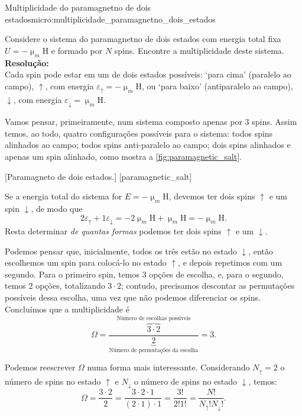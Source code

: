     \begin{example}{Multiplicidade do paramagnetno de dois estados}{micro:multiplicidade_paramagnetno_dois_estados}
        
        Considere o sistema do paramagnetno de dois estados com energia total fixa $U=-\upmu_m\mathrm{H}$ e formado por $N$ spins. Encontre a multiplicidade deste sistema.
        \tcblower
        \noindent\textbf{Resolução:}\\
        \indent Cada spin pode estar em um de dois estados possíveis: `para cima' (paralelo ao campo), $\uparrow$, com energia $\varepsilon_{\uparrow}=-\upmu_m\mathrm{H}$, ou `para baixo' (antiparalelo ao campo), $\downarrow$, com energia $\varepsilon_{\downarrow}=\upmu_m\mathrm{H}$.

        Vamos pensar, primeiramente, num sistema composto apenas por 3 spins. Assim temos, ao todo, quatro configurações possíveis para o sistema: todos spins alinhados ao campo; todos spins anti-paralelo ao campo; dois spins alinhados e apenas um spin alinhado, como mostra a \cref{fig:paramagnetic_salt}.

        \tikzFig%
            {\ParamagneticSalt}%
            [Paramagneto de dois estados.]%
            [paramagnetic_salt]%

        Se a energia total do sistema for $E=-\upmu_m\mathrm{H}$, devemos ter dois spins $\uparrow$ e um spin $\downarrow$, de modo que \[2\varepsilon_{\uparrow}+1\varepsilon_{\downarrow}=-2\upmu_m\mathrm{H}+\upmu_m\mathrm{H}=-\upmu_m\mathrm{H}.\] Resta determinar \textit{de quantas formas} podemos ter dois spins $\uparrow$ e um $\downarrow$. 
        
        Podemos pensar que, inicialmente, todos os três estão no estado $\downarrow$, então escolhemos um spin para colocá-lo no estado $\uparrow$, e depois repetimos com um segundo. Para o primeiro spin, temos 3 opções de escolha, e, para o segundo, temos 2 opções, totalizando $3\cdot2$; contudo, precisamos descontar as permutações possíveis dessa escolha, uma vez que não podemos diferenciar os spins. Concluímos que a multiplicidade é \[\Omega = \frac{\overbrace{3\cdot2}^{\text{Número de escolhas possíveis}}}{\underbrace{2}_{\text{Número de permutações da escolha}}}=3.\]

        Podemos reescrever $\Omega$ numa forma mais interessante. Considerando $N_{\uparrow}=2$ o número de spins no estado $\uparrow$ e $N_{\downarrow}$ o número de spins no estado $\downarrow$, temos: \[\Omega = \frac{3\cdot2}{2}=\frac{3\cdot2\cdot1}{(2\cdot1)\cdot1}=\frac{3!}{2!1!}=\frac{N!}{N_{\uparrow}!N_{\downarrow}!}.\]


\end{example}
